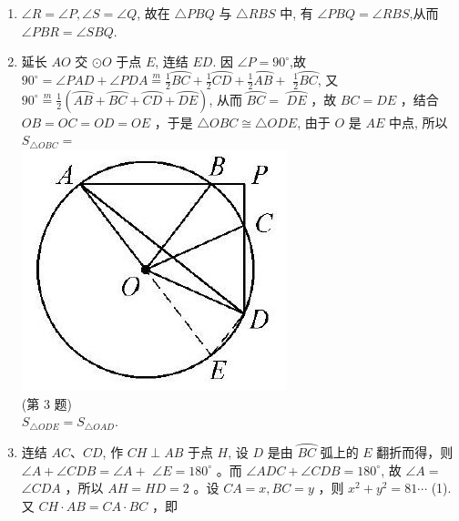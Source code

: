 \documentclass[10pt]{article}
\begin{document}
\begin{enumerate}
(第2题)
  \item $\angle R=\angle P, \angle S=\angle Q$, 故在 $\triangle P B Q$ 与 $\triangle R B S$ 中, 有 $\angle P B Q=\angle R B S$,从而 $\angle P B R=\angle S B Q$.
  \item 延长 $A O$ 交 $\odot O$ 于点 $E$, 连结 $E D$. 因 $\angle P=90^{\circ}$,故 $90^{\circ}=\angle P A D+\angle P D A \stackrel{m}{=} \frac{1}{2} \overparen{B C}+\frac{1}{2} \overparen{C D}+\frac{1}{2} \overparen{A B}+$ $\frac{1}{2} \overparen{B C}$, 又 $90^{\circ} \stackrel{m}{=} \frac{1}{2}(\overparen{A B}+\overparen{B C}+\overparen{C D}+\overparen{D E})$, 从而 $\overparen{B C}=$ $\overparen{D E}$ ，故 $B C=D E$ ，结合 $O B=O C=O D=O E$ ，于是 $\triangle O B C \cong \triangle O D E$, 由于 $O$ 是 $A E$ 中点, 所以 $S_{\triangle O B C}=$\\
\includegraphics[max width=\textwidth, center]{2024_10_30_66b8e5e701da2093c133g-089(3)}\\
(第 3 题)\\
$S_{\triangle O D E}=S_{\triangle O A D}$.
  \item 连结 $A C 、 C D$, 作 $C H \perp A B$ 于点 $H$, 设 $D$ 是由 $\overparen{B C}$ 弧上的 $E$ 翻折而得，则 $\angle A+\angle C D B=\angle A+$ $\angle E=180^{\circ}$ 。而 $\angle A D C+\angle C D B=180^{\circ}$, 故 $\angle A=$ $\angle C D A$ ，所以 $A H=H D=2$ 。设 $C A=x, B C=y$ ，则 $x^{2}+y^{2}=81 \cdots$ (1).又 $C H \cdot A B=C A \cdot B C$ ，即\\

\end{enumerate}
\end{document}

